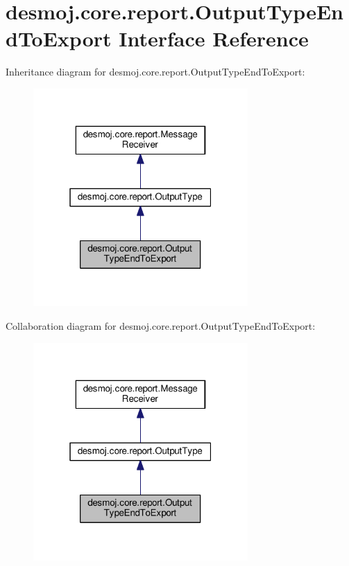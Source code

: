 \section{desmoj.\-core.\-report.\-Output\-Type\-End\-To\-Export Interface Reference}
\label{interfacedesmoj_1_1core_1_1report_1_1_output_type_end_to_export}


Inheritance diagram for desmoj.\-core.\-report.\-Output\-Type\-End\-To\-Export\-:
\nopagebreak
\begin{figure}[H]
\begin{center}
\leavevmode
\includegraphics[width=232pt]{interfacedesmoj_1_1core_1_1report_1_1_output_type_end_to_export__inherit__graph}
\end{center}
\end{figure}


Collaboration diagram for desmoj.\-core.\-report.\-Output\-Type\-End\-To\-Export\-:
\nopagebreak
\begin{figure}[H]
\begin{center}
\leavevmode
\includegraphics[width=232pt]{interfacedesmoj_1_1core_1_1report_1_1_output_type_end_to_export__coll__graph}
\end{center}
\end{figure}
